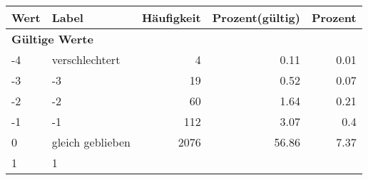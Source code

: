      \begin{longtable}{lXrrr}
     \toprule
     \textbf{Wert} & \textbf{Label} & \textbf{Häufigkeit} & \textbf{Prozent(gültig)} & \textbf{Prozent} \\
     \endhead
     \midrule
     \multicolumn{5}{l}{\textbf{Gültige Werte}}\\

     -4 &
     \multicolumn{1}{X}{ verschlechtert   } &


       \num{4} &
       \num[round-mode=places,round-precision=2]{0,11} &
         \num[round-mode=places,round-precision=2]{0,01} \\

     -3 &
     \multicolumn{1}{X}{ -3   } &


       \num{19} &
       \num[round-mode=places,round-precision=2]{0,52} &
         \num[round-mode=places,round-precision=2]{0,07} \\

     -2 &
     \multicolumn{1}{X}{ -2   } &


       \num{60} &
       \num[round-mode=places,round-precision=2]{1,64} &
         \num[round-mode=places,round-precision=2]{0,21} \\

     -1 &
     \multicolumn{1}{X}{ -1   } &


       \num{112} &
       \num[round-mode=places,round-precision=2]{3,07} &
         \num[round-mode=places,round-precision=2]{0,4} \\

     0 &
     \multicolumn{1}{X}{ gleich geblieben   } &


       \num{2076} &
       \num[round-mode=places,round-precision=2]{56,86} &
         \num[round-mode=places,round-precision=2]{7,37} \\

     1 &
     \multicolumn{1}{X}{ 1   } &



\end{longtable}
